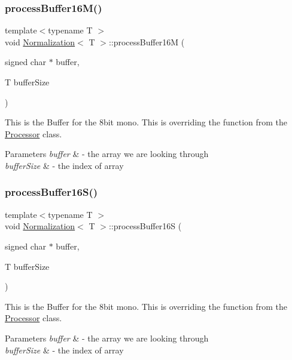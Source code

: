 \subsubsection{\texorpdfstring{process\+Buffer16\+M()}{processBuffer16M()}}
{\footnotesize\ttfamily template$<$typename T $>$ \\
void \hyperlink{classNormalization}{Normalization}$<$ T $>$\+::process\+Buffer16M (\begin{DoxyParamCaption}\item[{signed char $\ast$}]{buffer,  }\item[{T}]{buffer\+Size }\end{DoxyParamCaption})\hspace{0.3cm}{\ttfamily [override]}}

This is the Buffer for the 8bit mono. This is overriding the function from the \hyperlink{classProcessor}{Processor} class. 
\begin{DoxyParams}{Parameters}
{\em buffer} & -\/ the array we are looking through \\
\hline
{\em buffer\+Size} & -\/ the index of array \\
\hline
\end{DoxyParams}
\mbox{\label{classNormalization_a559502cea563e0bb0548177659473f7a}} 
\subsubsection{\texorpdfstring{process\+Buffer16\+S()}{processBuffer16S()}}
{\footnotesize\ttfamily template$<$typename T $>$ \\
void \hyperlink{classNormalization}{Normalization}$<$ T $>$\+::process\+Buffer16S (\begin{DoxyParamCaption}\item[{signed char $\ast$}]{buffer,  }\item[{T}]{buffer\+Size }\end{DoxyParamCaption})\hspace{0.3cm}{\ttfamily [override]}}

This is the Buffer for the 8bit mono. This is overriding the function from the \hyperlink{classProcessor}{Processor} class. 
\begin{DoxyParams}{Parameters}
{\em buffer} & -\/ the array we are looking through \\
\hline
{\em buffer\+Size} & -\/ the index of array \\
\hline
\end{DoxyParams}
\mbox{\label{classNormalization_ae9e63da4207cd62c8879c1ea386a593b}} 

